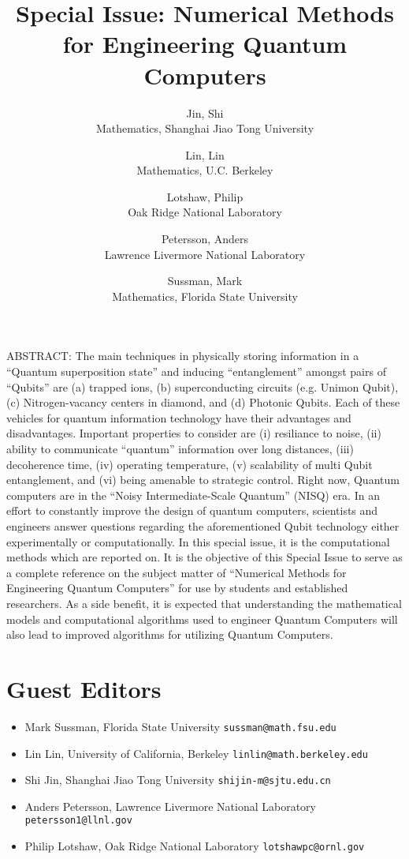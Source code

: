 \documentclass[]{article}
\title{Special Issue: Numerical Methods for Engineering Quantum Computers}
\author{
  Jin, Shi \\
  Mathematics, Shanghai Jiao Tong University
  \and
  Lin, Lin \\
  Mathematics, U.C. Berkeley
  \and
  Lotshaw, Philip \\
  Oak Ridge National Laboratory
  \and
  Petersson, Anders \\
  Lawrence Livermore National Laboratory
  \and
  Sussman, Mark \\
  Mathematics, Florida State University
}
\begin{document}
\maketitle

ABSTRACT:
The main techniques in physically storing information in a ``Quantum superposition state'' and inducing ``entanglement'' amongst pairs of ``Qubits'' are (a) trapped ions, (b) superconducting circuits (e.g. Unimon Qubit), (c) Nitrogen-vacancy centers in diamond, and (d) Photonic Qubits.  Each of these vehicles for quantum information technology have their advantages and disadvantages.  Important properties to consider are (i) resiliance to noise, (ii) ability to communicate ``quantum'' information over long distances, (iii) decoherence time, (iv) operating temperature, (v) scalability of multi Qubit entanglement, and (vi) being amenable to strategic control.  Right now, Quantum computers are in the ``Noisy Intermediate-Scale Quantum'' (NISQ) era.  In an effort to constantly improve the design of quantum computers, scientists and engineers answer questions regarding the aforementioned Qubit technology either experimentally or computationally.  In this special issue, it is the computational methods which are reported on.  It is the objective of this Special Issue to serve as a complete reference on the subject matter of ``Numerical Methods for Engineering Quantum Computers'' for use by students and established researchers.  As a side benefit, it is expected that understanding the mathematical models and computational algorithms used to engineer Quantum Computers will also lead to improved algorithms for utilizing Quantum Computers.

\section{Guest Editors}

\begin{itemize}
\item
Mark Sussman, Florida State University \verb=sussman@math.fsu.edu=
\item
Lin Lin, University of California, Berkeley \verb=linlin@math.berkeley.edu=
\item
Shi Jin, Shanghai Jiao Tong University \verb=shijin-m@sjtu.edu.cn=
\item
Anders Petersson, Lawrence Livermore National Laboratory
\verb=petersson1@llnl.gov=
\item
Philip Lotshaw, Oak Ridge National Laboratory
\verb=lotshawpc@ornl.gov=
\end{itemize}
\end{document}
